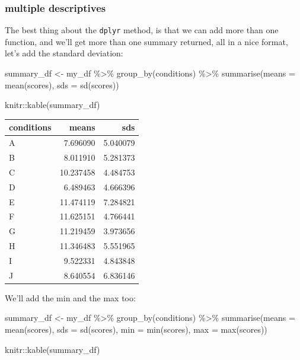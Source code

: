 \documentclass[
]{book}
\newenvironment{Shaded}{\begin{snugshade}}{\end{snugshade}}
\newcommand{\AttributeTok}[1]{\textcolor[rgb]{0.77,0.63,0.00}{#1}}
\newcommand{\FunctionTok}[1]{\textcolor[rgb]{0.00,0.00,0.00}{#1}}
\newcommand{\NormalTok}[1]{#1}
\newcommand{\OtherTok}[1]{\textcolor[rgb]{0.56,0.35,0.01}{#1}}
\newcommand{\SpecialCharTok}[1]{\textcolor[rgb]{0.00,0.00,0.00}{#1}}
\begin{document}
\hypertarget{multiple-descriptives}{%
\subsubsection{multiple descriptives}\label{multiple-descriptives}}

The best thing about the \texttt{dplyr} method, is that we can add more than one function, and we'll get more than one summary returned, all in a nice format, let's add the standard deviation:

\begin{Shaded}
\begin{Highlighting}[]
\NormalTok{summary\_df }\OtherTok{\textless{}{-}}\NormalTok{ my\_df }\SpecialCharTok{\%\textgreater{}\%}
               \FunctionTok{group\_by}\NormalTok{(conditions) }\SpecialCharTok{\%\textgreater{}\%}
               \FunctionTok{summarise}\NormalTok{(}\AttributeTok{means =} \FunctionTok{mean}\NormalTok{(scores),}
                         \AttributeTok{sds =} \FunctionTok{sd}\NormalTok{(scores))}

\NormalTok{knitr}\SpecialCharTok{::}\FunctionTok{kable}\NormalTok{(summary\_df)}
\end{Highlighting}
\end{Shaded}

\begin{tabular}{l|r|r}
\hline
conditions & means & sds\\
\hline
A & 7.696090 & 5.040079\\
\hline
B & 8.011910 & 5.281373\\
\hline
C & 10.237458 & 4.484753\\
\hline
D & 6.489463 & 4.666396\\
\hline
E & 11.474119 & 7.284821\\
\hline
F & 11.625151 & 4.766441\\
\hline
G & 11.219459 & 3.973656\\
\hline
H & 11.346483 & 5.551965\\
\hline
I & 9.522331 & 4.843848\\
\hline
J & 8.640554 & 6.836146\\
\hline
\end{tabular}

We'll add the min and the max too:

\begin{Shaded}
\begin{Highlighting}[]
\NormalTok{summary\_df }\OtherTok{\textless{}{-}}\NormalTok{ my\_df }\SpecialCharTok{\%\textgreater{}\%}
               \FunctionTok{group\_by}\NormalTok{(conditions) }\SpecialCharTok{\%\textgreater{}\%}
               \FunctionTok{summarise}\NormalTok{(}\AttributeTok{means =} \FunctionTok{mean}\NormalTok{(scores),}
                         \AttributeTok{sds =} \FunctionTok{sd}\NormalTok{(scores),}
                         \AttributeTok{min =} \FunctionTok{min}\NormalTok{(scores),}
                         \AttributeTok{max =} \FunctionTok{max}\NormalTok{(scores))}

\NormalTok{knitr}\SpecialCharTok{::}\FunctionTok{kable}\NormalTok{(summary\_df)}
\end{Highlighting}
\end{Shaded}
\end{document}
